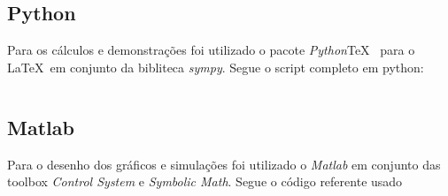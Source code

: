 \documentclass[a4paper,11pt]{article}
\begin{document}
\subsection*{Python}

Para os cálculos e demonstrações foi utilizado o pacote \textit{Python}\TeX\ \cite{pythontex} para o \LaTeX\ em conjunto da bibliteca \textit{sympy}\cite{sympy}. Segue o script completo em python:

\inputminted[xleftmargin=15pt,linenos,frame=single,framesep=5pt,breaklines=true]{python}{../python/exsim3.py}

\newpage
\subsection*{Matlab}

Para o desenho dos gráficos e simulações foi utilizado o \textit{Matlab} em conjunto das toolbox \textit{Control System}\cite{matlabcontrol} e \textit{Symbolic Math}\cite{matlabsymbolic}. Segue o código referente usado

\inputminted[xleftmargin=15pt,linenos,frame=single,framesep=5pt,breaklines=true]{matlab}{../matlab/exsim3.m}




\end{document}
